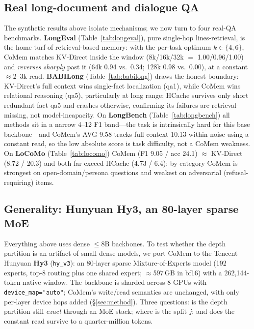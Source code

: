 \subsection{Real long-document and dialogue QA}
The synthetic results above isolate mechanisms; we now turn to four real-QA
benchmarks. \textbf{LongEval} (Table~\ref{tab:longeval}), pure single-hop
lines-retrieval, is the home turf of retrieval-based memory: with the per-task
optimum $k{\in}\{4,6\}$, CoMem matches KV-Direct inside the window
(8k/16k/32k $=$ 1.00/0.96/1.00) and \emph{reverses sharply} past it (64k 0.94
vs.\ 0.34; 128k 0.98 vs.\ 0.00), at a constant $\approx$2--3k read.
\textbf{BABILong} (Table~\ref{tab:babilong}) draws the honest boundary:
KV-Direct's full context wins single-fact localization (qa1), while CoMem wins
relational reasoning (qa5), particularly at long range; HCache survives only
short redundant-fact qa5 and crashes otherwise, confirming its failures are
retrieval-missing, not model-incapacity. On \textbf{LongBench}
(Table~\ref{tab:longbench}) all methods sit in a narrow 4--12 F1 band---the task
is intrinsically hard for this base backbone---and CoMem's AVG 9.58 tracks
full-context 10.13 within noise using a constant read, so the low absolute score
is task difficulty, not a CoMem weakness. On \textbf{LoCoMo}
(Table~\ref{tab:locomo}) CoMem (F1 9.05 / acc 24.1) $\approx$ KV-Direct
(8.72 / 20.3) and both far exceed HCache (4.73 / 6.4); by category CoMem is
strongest on open-domain/persona questions and weakest on adversarial
(refusal-requiring) items.






\subsection{Generality: Hunyuan Hy3, an 80-layer sparse MoE}
\label{sec:hy3-general}
Everything above uses dense $\le$8B backbones. To test whether the depth
partition is an artifact of small dense models, we port CoMem to the Tencent
Hunyuan \textbf{Hy3} (\texttt{hy\_v3}): an 80-layer sparse Mixture-of-Experts
model (192 experts, top-8 routing plus one shared expert; $\approx$597\,GB in
bf16) with a 262{,}144-token native window. The backbone is sharded across 8
GPUs with \texttt{device\_map="auto"}; CoMem's write/read semantics are
unchanged, with only per-layer device hops added (\S\ref{sec:method}). Three
questions: is the depth partition still \emph{exact} through an MoE stack; where
is the split $j$; and does the constant read survive to a quarter-million tokens.

